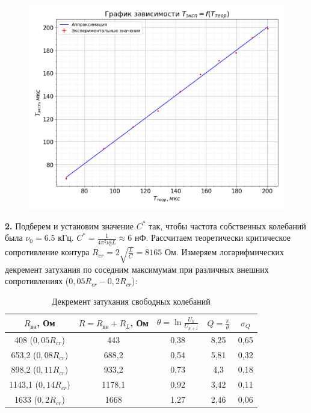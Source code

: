 \documentclass[a4paper, 12pt]{article}
\begin{document}
        \begin{figure}[H]
            \centering
            \includegraphics[scale=0.5]{img/T_plot.png}
        \end{figure}

        \textbf{2.} Подберем и установим значение $C^*$ так, чтобы частота собственных колебаний была $\nu_0 = 6.5$ кГц. $C^* = \frac{1}{4\pi^2\nu_0^2L} \approx 6$ нФ. Рассчитаем теоретически критическое сопротивление контура $R_{cr} = 2\sqrt{\frac{L}{C}} = 8165$ Ом. Измеряем логарифмических декремент затухания по соседним максимумам при различных внешних сопротивлениях ($0,05 R_{cr} - 0,2R_{cr}$):
        \newpage
        \begin{table}[h]
            \centering
            \begin{tabular}{|c|c|c|c|c|}
                \hline
                $R_{\text{вн}}$, Ом & $R = R_{\text{вн}} + R_L$, Ом& $\theta = \ln \frac{U_k}{U_{k+1}}$ & $Q = \frac{\pi}{\theta}$ & $\sigma_{Q}$ \\ \hline
                408 ($0,05R_{cr}$) & 443 & 0,38 & 8,25 & 0,65 \\ \hline
                653,2 ($0,08R_{cr}$) & 688,2 & 0,54 & 5,81 & 0,32  \\ \hline
                898,2 ($0,11R_{cr}$) & 933,2 & 0,73 & 4,3 & 0,18 \\ \hline
                1143,1 ($0,14R_{cr}$) & 1178,1 & 0,92 & 3,42 & 0,11 \\ \hline
                1633 ($0,2R_{cr}$) & 1668 & 1,27 & 2,46 & 0,06 \\ \hline
            \end{tabular}
            \caption{Декремент затухания свободных колебаний}
        \end{table}
\end{document}
